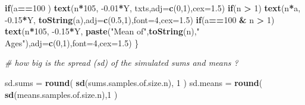 \documentclass[
]{article}
\newenvironment{Shaded}{\begin{snugshade}}{\end{snugshade}}
\newcommand{\CommentTok}[1]{\textcolor[rgb]{0.56,0.35,0.01}{\textit{#1}}}
\newcommand{\ControlFlowTok}[1]{\textcolor[rgb]{0.13,0.29,0.53}{\textbf{#1}}}
\newcommand{\DataTypeTok}[1]{\textcolor[rgb]{0.13,0.29,0.53}{#1}}
\newcommand{\DecValTok}[1]{\textcolor[rgb]{0.00,0.00,0.81}{#1}}
\newcommand{\FloatTok}[1]{\textcolor[rgb]{0.00,0.00,0.81}{#1}}
\newcommand{\KeywordTok}[1]{\textcolor[rgb]{0.13,0.29,0.53}{\textbf{#1}}}
\newcommand{\NormalTok}[1]{#1}
\newcommand{\OperatorTok}[1]{\textcolor[rgb]{0.81,0.36,0.00}{\textbf{#1}}}
\newcommand{\StringTok}[1]{\textcolor[rgb]{0.31,0.60,0.02}{#1}}
\begin{document}
\begin{Shaded}
\begin{Highlighting}[]
     \ControlFlowTok{if}\NormalTok{(a}\OperatorTok{==}\DecValTok{100}\NormalTok{ ) }\KeywordTok{text}\NormalTok{(n}\OperatorTok{*}\DecValTok{105}\NormalTok{, }\FloatTok{-0.01}\OperatorTok{*}\NormalTok{Y,}
\NormalTok{          txts,}\DataTypeTok{adj=}\KeywordTok{c}\NormalTok{(}\DecValTok{0}\NormalTok{,}\DecValTok{1}\NormalTok{),}\DataTypeTok{cex=}\FloatTok{1.5}\NormalTok{)}
     \ControlFlowTok{if}\NormalTok{(n }\OperatorTok{>}\StringTok{ }\DecValTok{1}\NormalTok{) }\KeywordTok{text}\NormalTok{(n}\OperatorTok{*}\NormalTok{a, }\FloatTok{-0.15}\OperatorTok{*}\NormalTok{Y, }\KeywordTok{toString}\NormalTok{(a),}\DataTypeTok{adj=}\KeywordTok{c}\NormalTok{(}\FloatTok{0.5}\NormalTok{,}\DecValTok{1}\NormalTok{),}\DataTypeTok{font=}\DecValTok{4}\NormalTok{,}\DataTypeTok{cex=}\FloatTok{1.5}\NormalTok{)}
     \ControlFlowTok{if}\NormalTok{(a}\OperatorTok{==}\DecValTok{100} \OperatorTok{&}\StringTok{ }\NormalTok{n }\OperatorTok{>}\StringTok{ }\DecValTok{1}\NormalTok{) }\KeywordTok{text}\NormalTok{(n}\OperatorTok{*}\DecValTok{105}\NormalTok{, }\FloatTok{-0.15}\OperatorTok{*}\NormalTok{Y,}
          \KeywordTok{paste}\NormalTok{(}\StringTok{"Mean of"}\NormalTok{,}\KeywordTok{toString}\NormalTok{(n),}\StringTok{" Ages"}\NormalTok{),}\DataTypeTok{adj=}\KeywordTok{c}\NormalTok{(}\DecValTok{0}\NormalTok{,}\DecValTok{1}\NormalTok{),}\DataTypeTok{font=}\DecValTok{4}\NormalTok{,}\DataTypeTok{cex=}\FloatTok{1.5}\NormalTok{)}
\NormalTok{   \}}
   
   \CommentTok{# how big is the spread (sd) of the simulated sums and means ?}
   
\NormalTok{   sd.sums  =}\StringTok{ }\KeywordTok{round}\NormalTok{( }\KeywordTok{sd}\NormalTok{(sums.samples.of.size.n), }\DecValTok{1}\NormalTok{ )}
\NormalTok{   sd.means =}\StringTok{ }\KeywordTok{round}\NormalTok{( }\KeywordTok{sd}\NormalTok{(means.samples.of.size.n),}\DecValTok{1}\NormalTok{ )}
   

\end{Highlighting}
\end{Shaded}
\end{document}

